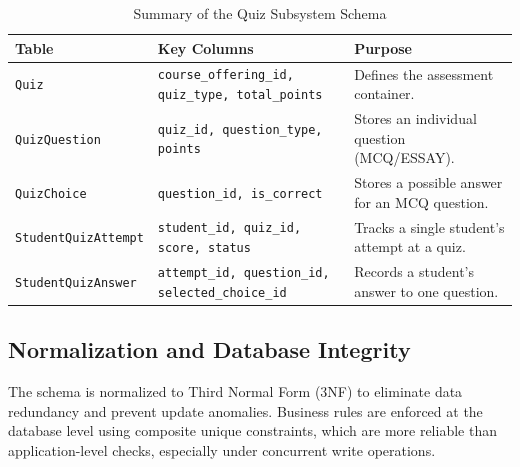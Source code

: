 \begin{table}[H]
    \centering
    \renewcommand{\arraystretch}{1.3}
    \small  %
    \begin{tabular}{|p{}|p{}|p{}|}
        \hline
        \textbf{Table} & \textbf{Key Columns} & \textbf{Purpose} \\ \hline
        \texttt{Quiz} & \texttt{course\_offering\_id, quiz\_type, total\_points} & Defines the assessment container. \\
        \texttt{QuizQuestion} & \texttt{quiz\_id, question\_type, points} & Stores an individual question (MCQ/ESSAY). \\
        \texttt{QuizChoice} & \texttt{question\_id, is\_correct} & Stores a possible answer for an MCQ question. \\
        \texttt{StudentQuizAttempt} & \texttt{student\_id, quiz\_id, score, status} & Tracks a single student's attempt at a quiz. \\
        \texttt{StudentQuizAnswer} & \texttt{attempt\_id, question\_id, selected\_choice\_id} & Records a student's answer to one question. \\ \hline
    \end{tabular}
    \caption{Summary of the Quiz Subsystem Schema}
    \label{tab:quiz_schema}
\end{table}

\subsection{Normalization and Database Integrity}

The schema is normalized to Third Normal Form (3NF) to eliminate data redundancy and prevent update anomalies. Business rules are enforced at the database level using composite unique constraints, which are more reliable than application-level checks, especially under concurrent write operations.

